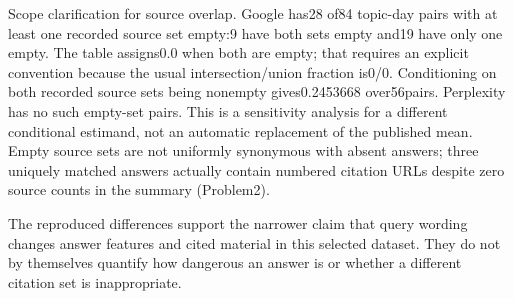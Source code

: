 \documentclass[10pt]{article}
\begin{document}
Scope clarification for source overlap. Google has28 of84 topic-day pairs with at least one recorded source set empty:9 have both sets empty and19 have only one empty. The table assigns0.0 when both are empty; that requires an explicit convention because the usual intersection/union fraction is0/0. Conditioning on both recorded source sets being nonempty gives0.2453668 over56pairs. Perplexity has no such empty-set pairs. This is a sensitivity analysis for a different conditional estimand, not an automatic replacement of the published mean. Empty source sets are not uniformly synonymous with absent answers; three uniquely matched answers actually contain numbered citation URLs despite zero source counts in the summary (Problem2).\par
The reproduced differences support the narrower claim that query wording changes answer features and cited material in this selected dataset. They do not by themselves quantify how dangerous an answer is or whether a different citation set is inappropriate.\par
\end{document}
